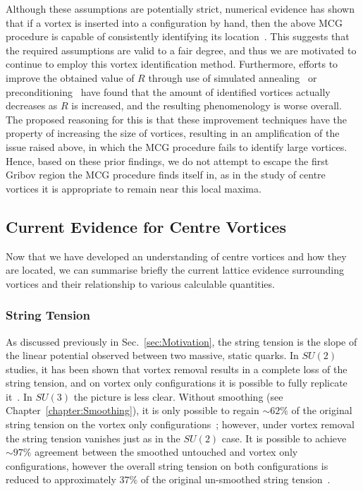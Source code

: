 Although these assumptions are potentially strict, numerical evidence has shown that if a vortex is inserted into a configuration by hand, then the above MCG procedure is capable of consistently identifying its location~\cite{Faber:1999gu,Montero:1999by}. This suggests that the required assumptions are valid to a fair degree, and thus we are motivated to continue to employ this vortex identification method. Furthermore, efforts to improve the obtained value of $R$ through use of simulated annealing~\cite{Bogolubsky:2009dc} or preconditioning~\cite{Cais:2008za} have found that the amount of identified vortices actually decreases as $R$ is increased, and the resulting phenomenology is worse overall. The proposed reasoning for this is that these improvement techniques have the property of increasing the size of vortices, resulting in an amplification of the issue raised above, in which the MCG procedure fails to identify large vortices. Hence, based on these prior findings, we do not attempt to escape the first Gribov region the MCG procedure finds itself in, as in the study of centre vortices it is appropriate to remain near this local maxima.

\subsection{Current Evidence for Centre Vortices}\label{sec:CurrentEvidence}
Now that we have developed an understanding of centre vortices and how they are located, we can summarise briefly the current lattice evidence surrounding vortices and their relationship to various calculable quantities.
 
\subsubsection{String Tension}
As discussed previously in Sec.~\ref{sec:Motivation}, the string tension is the slope of the linear potential observed between two massive, static quarks. In $SU(2)$ studies, it has been shown that vortex removal results in a complete loss of the string tension, and on vortex only configurations it is possible to fully replicate it~\cite{Cais:2008za}. In $SU(3)$ the picture is less clear. Without smoothing (see Chapter~\ref{chapter:Smoothing}), it is only possible to regain $\sim 62\%$ of the original string tension on the vortex only configurations~\cite{Langfeld:2003ev}; however, under vortex removal the string tension vanishes just as in the $SU(2)$ case. It is possible to achieve $\sim 97\%$ agreement between the smoothed untouched and vortex only configurations, however the overall string tension on both configurations is reduced to approximately $37\%$ of the original un-smoothed string tension~\cite{Trewartha:2015ida}.  

